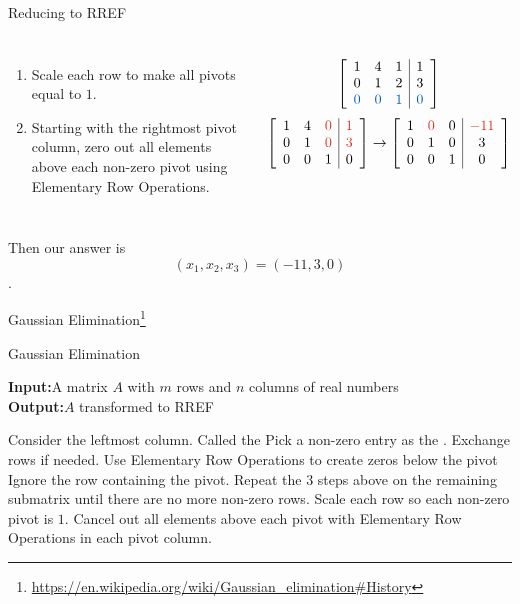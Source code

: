\documentclass[xcoler=dvipsnames, aspectratio=169]{beamer}
\newcommand{\INPUT}{\textbf{Input:}}
\newcommand{\OUTPUT}{\textbf{Output:}}
\begin{document}
    \begin{frame}{Reducing to RREF}
        \small
        \begin{columns}
            \begin{enumerate}
                \addtocounter{enumi}{4}
                \item Scale each row to make all pivots equal to $1$.
                \item Starting with the rightmost pivot column, zero out all elements above each non-zero pivot using Elementary Row Operations.
            \end{enumerate}
            \[
                \aMat{ccc|c}{
                    1 & 4 & 1 & 1 \\
                    0 & 1 & 2 & 3 \\
                    \bText{0} & \bText{0} & \bText{1} & \bText{0}
            }
            \]
            \[
                \aMat{ccc|c}{
                    1 & 4 & \rText{0} & \rText{1} \\
                    0 & 1 & \rText{0} & \rText{3} \\
                    0 & 0 & 1 & 0 
            }\rightarrow
                \aMat{ccc|c}{
                    1 & \rText{0} & 0 & \rText{-11} \\
                    0 & 1 & 0 & 3 \\
                    0 & 0 & 1 & 0 
            }
            \]
        \end{columns}
        Then our answer is \[(x_1,x_2,x_3)=(-11,3,0)\].
    \end{frame}
    \begin{frame}{Gaussian Elimination\footnote{\url{https://en.wikipedia.org/wiki/Gaussian\_elimination\#History}}}
        \begin{algorithm}[H]
            \small
            \caption{Gaussian Elimination}
            \INPUT A matrix $A$ with $m$ rows and $n$ columns of real numbers\\
            \OUTPUT $A$ transformed to RREF
            \begin{algorithmic}[1]
                \STATE Consider the leftmost column. Called the 
                \STATE Pick a non-zero entry as the . Exchange rows if needed.
                \STATE Use Elementary Row Operations to create zeros below the pivot
                \STATE Ignore the row containing the pivot. Repeat the $3$ steps above on the remaining submatrix until there are no more non-zero rows.
                \STATE Scale each row so each non-zero pivot is $1$.
                \STATE Cancel out all elements above each pivot with Elementary Row Operations in each pivot column.
            \end{algorithmic}
        \end{algorithm}
    \end{frame}
\end{document}
